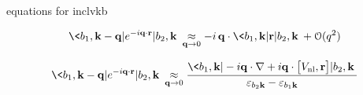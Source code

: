 \documentclass[a4paper,reqno,11pt,twoside]{book}
\begin{document}
equations for inclvkb 

\begin{equation}
\<b_1,\kmq|e^{-i\qq\cdot\rr}|b_2,\kk\> \underset{\qq \rarr 0}{\approx}
-i\,\qq\cdot \<b_1,\kk|\rr|b_2,\kk\> + \mcO(q^2)
\end{equation}



\begin{equation}
\<b_1,\kmq|e^{-i\qq\cdot\rr}|b_2,\kk\> \underset{\qq \rarr 0}{\approx}
\dfrac{
\<b_1,\kk|-i\qq\cdot\nabla + i\qq\cdot \bigl[\Vnl,\rr\bigr]|b_2,\kk\>
}
{
\varepsilon_{b_2\kk} - \varepsilon_{b_1\kk}
}
\end{equation}
\end{document}
